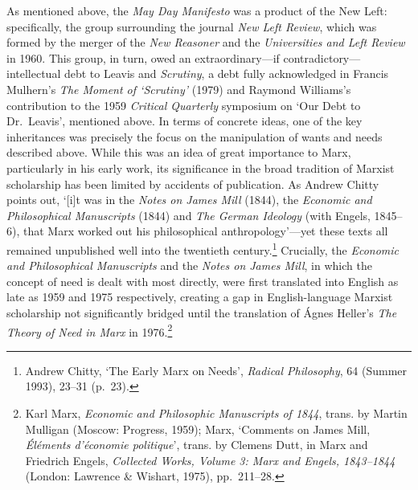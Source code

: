 \documentclass[]{article}
\begin{document}
As mentioned above, the \emph{May Day Manifesto} was a product of the
New Left: specifically, the group surrounding the journal \emph{New Left
Review}, which was formed by the merger of the \emph{New Reasoner} and
the \emph{Universities and Left Review} in 1960. This group, in turn,
owed an extraordinary—if contradictory—intellectual debt to Leavis and
\emph{Scrutiny}, a debt fully acknowledged in Francis Mulhern’s
\emph{The Moment of ‘Scrutiny’} (1979) and Raymond Williams’s
contribution to the 1959 \emph{Critical Quarterly} symposium on ‘Our
Debt to Dr.~Leavis’, mentioned above. In terms of concrete ideas, one of
the key inheritances was precisely the focus on the manipulation of
wants and needs described above. While this was an idea of great
importance to Marx, particularly in his early work, its significance in
the broad tradition of Marxist scholarship has been limited by accidents
of publication. As Andrew Chitty points out, ‘{[}i{]}t was in the
\emph{Notes on James Mill} (1844), the \emph{Economic and Philosophical
Manuscripts} (1844) and \emph{The German Ideology} (with Engels,
1845–6), that Marx worked out his philosophical anthropology’—yet these
texts all remained unpublished well into the twentieth
century.\footnote{Andrew Chitty, ‘The Early Marx on Needs’,
  \emph{Radical Philosophy}, 64 (Summer 1993), 23–31 (p.~23).}
Crucially, the \emph{Economic and Philosophical Manuscripts} and the
\emph{Notes on James Mill}, in which the concept of need is dealt with
most directly, were first translated into English as late as 1959 and
1975 respectively, creating a gap in English-language Marxist
scholarship not significantly bridged until the translation of Ágnes
Heller’s \emph{The Theory of Need in Marx} in 1976.\footnote{Karl Marx,
  \emph{Economic and Philosophic Manuscripts of 1844}, trans. by Martin
  Mulligan (Moscow: Progress, 1959); Marx, ‘Comments on James Mill,
  \emph{Éléments d’économie politique}’, trans. by Clemens Dutt, in Marx
  and Friedrich Engels, \emph{Collected Works, Volume 3: Marx and
  Engels, 1843–1844} (London: Lawrence \& Wishart, 1975), pp.~211–28.}
\end{document}

